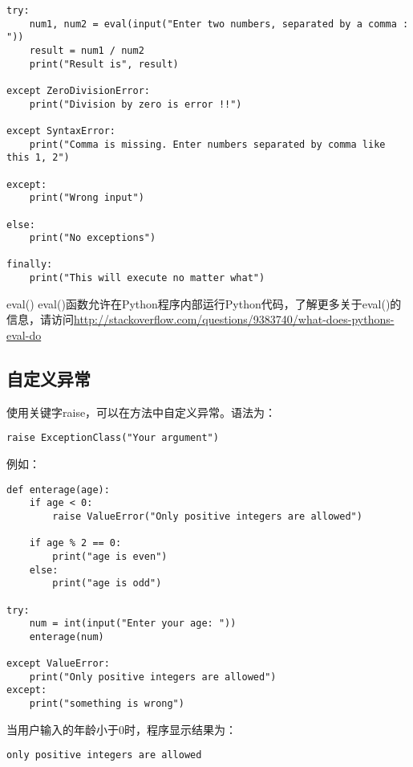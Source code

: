 \begin{lstlisting}
try:
    num1, num2 = eval(input("Enter two numbers, separated by a comma : "))
    result = num1 / num2
    print("Result is", result)

except ZeroDivisionError:
    print("Division by zero is error !!")

except SyntaxError:
    print("Comma is missing. Enter numbers separated by comma like this 1, 2")

except:
    print("Wrong input")

else:
    print("No exceptions")

finally:
    print("This will execute no matter what")
\end{lstlisting}

\begin{myremark}{eval()}
eval()函数允许在Python程序内部运行Python代码，了解更多关于eval()的信息，请访问\url{http://stackoverflow.com/questions/9383740/what-does-pythons-eval-do}
\end{myremark}

\subsection{自定义异常}
使用关键字raise，可以在方法中自定义异常。语法为：

\begin{lstlisting}
raise ExceptionClass("Your argument")
\end{lstlisting}

例如：

\begin{lstlisting}
def enterage(age):
    if age < 0:
        raise ValueError("Only positive integers are allowed")

    if age % 2 == 0:
        print("age is even")
    else:
        print("age is odd")

try:
    num = int(input("Enter your age: "))
    enterage(num)

except ValueError:
    print("Only positive integers are allowed")
except:
    print("something is wrong")
\end{lstlisting}
当用户输入的年龄小于0时，程序显示结果为：

\begin{lstlisting}
only positive integers are allowed
\end{lstlisting}
